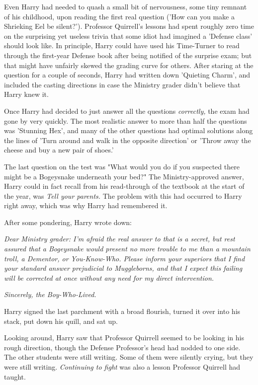 Even Harry had needed to quash a small bit of nervousness, some tiny remnant of 
his childhood, upon reading the first real question ('How can you make a 
Shrieking Eel be silent?'). Professor Quirrell's lessons had spent roughly zero 
time on the surprising yet useless trivia that some idiot had imagined a 
'Defense class' should look like. In principle, Harry could have used his 
Time-Turner to read through the first-year Defense book after being notified of 
the surprise exam; but that might have unfairly skewed the grading curve for 
others. After staring at the question for a couple of seconds, Harry had 
written down 'Quieting Charm', and included the casting directions in case the 
Ministry grader didn't believe that Harry knew it.

Once Harry had decided to just answer all the questions \emph{correctly,} the 
exam had gone by very quickly. The most realistic answer to more than half the 
questions was 'Stunning Hex', and many of the other questions had optimal 
solutions along the lines of 'Turn around and walk in the opposite direction' 
or 'Throw away the cheese and buy a new pair of shoes.'

The last question on the test was "What would you do if you suspected there 
might be a Bogeysnake underneath your bed?" The Ministry-approved answer, Harry 
could in fact recall from his read-through of the textbook at the start of the 
year, was \emph{Tell your parents.} The problem with this had occurred to Harry 
right away, which was why Harry had remembered it.

After some pondering, Harry wrote down:

\emph{Dear Ministry grader: I'm afraid the real answer to that is a secret, but 
rest assured that a Bogeysnake would present no more trouble to me than a 
mountain troll, a Dementor, or You-Know-Who. Please inform your superiors that 
I find your standard answer prejudicial to Muggleborns, and that I expect this 
failing will be corrected at once without any need for my direct intervention.}

\emph{Sincerely, the Boy-Who-Lived.}

Harry signed the last parchment with a broad flourish, turned it over into his 
stack, put down his quill, and sat up.

Looking around, Harry saw that Professor Quirrell seemed to be looking in his 
rough direction, though the Defense Professor's head had nodded to one side. 
The other students were still writing. Some of them were silently crying, but 
they were still writing. \emph{Continuing to fight} was also a lesson Professor 
Quirrell had taught.


